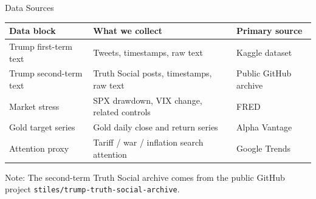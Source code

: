 \begin{frame}{Data Sources}
  \small
  \begin{table}
    \centering
    \renewcommand{\arraystretch}{1.35}
    \begin{tabular}{>{\raggedright\arraybackslash}p{} >{\raggedright\arraybackslash}p{} >{\raggedright\arraybackslash}p{}}
      \toprule
      Data block & What we collect & Primary source \\
      \midrule
      Trump first-term text & Tweets, timestamps, raw text & Kaggle dataset \\
      Trump second-term text & Truth Social posts, timestamps, raw text & Public GitHub archive \\
      Market stress & SPX drawdown, VIX change, related controls & FRED \\
      Gold target series & Gold daily close and return series & Alpha Vantage \\
      Attention proxy & Tariff / war / inflation search attention & Google Trends \\
      \bottomrule
    \end{tabular}
  \end{table}

  \vspace{0.4em}
  \tiny
  Note: The second-term Truth Social archive comes from the public GitHub project \texttt{stiles/trump-truth-social-archive}.
\end{frame}
